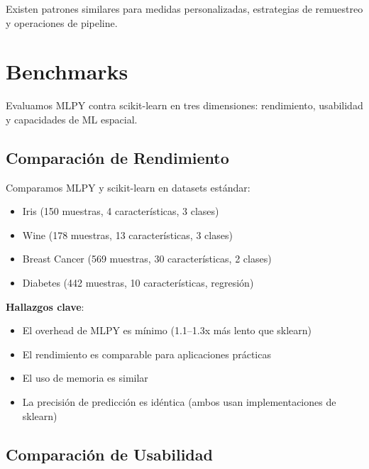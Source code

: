 \documentclass[twoside,11pt]{article}
\begin{document}
Existen patrones similares para medidas personalizadas, estrategias de remuestreo y operaciones de pipeline.

\section{Benchmarks}
\label{sec:benchmarks}

Evaluamos MLPY contra scikit-learn en tres dimensiones: rendimiento, usabilidad y capacidades de ML espacial.

\subsection{Comparación de Rendimiento}


Comparamos MLPY y scikit-learn en datasets estándar:
\begin{itemize}
  \item Iris (150 muestras, 4 características, 3 clases)
  \item Wine (178 muestras, 13 características, 3 clases)
  \item Breast Cancer (569 muestras, 30 características, 2 clases)
  \item Diabetes (442 muestras, 10 características, regresión)
\end{itemize}

\textbf{Hallazgos clave}:
\begin{itemize}
  \item El overhead de MLPY es mínimo (1.1--1.3x más lento que sklearn)
  \item El rendimiento es comparable para aplicaciones prácticas
  \item El uso de memoria es similar
  \item La precisión de predicción es idéntica (ambos usan implementaciones de sklearn)
\end{itemize}


\subsection{Comparación de Usabilidad}
\end{document}
